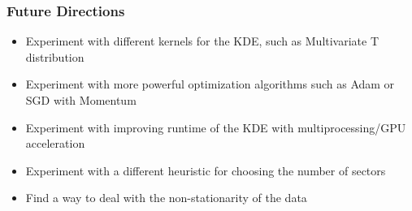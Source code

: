 \documentclass{beamer}
\begin{document}
\begin{frame}
    \frametitle{Future Directions}
    \begin{itemize}
        \item Experiment with different kernels for the KDE, such as Multivariate T distribution
        \item Experiment with more powerful optimization algorithms such as Adam or SGD with Momentum
        \item Experiment with improving runtime of the KDE with multiprocessing/GPU acceleration
        \item Experiment with a different heuristic for choosing the number of sectors
        \item Find a way to deal with the non-stationarity of the data
    \end{itemize}
\end{frame}
\end{document}
